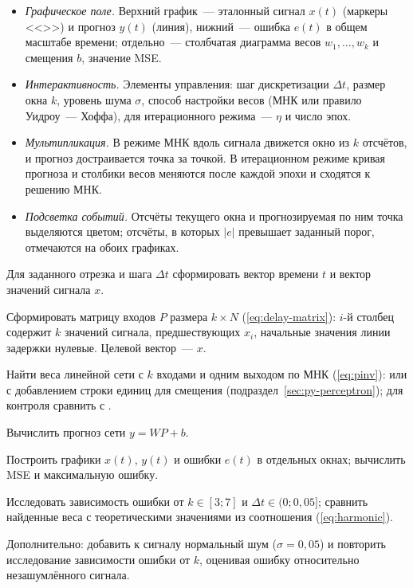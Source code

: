 \begin{itemize}
\item \emph{Графическое поле.} Верхний график~--- эталонный сигнал $x(t)$ (маркеры <<\code{*}>>) и прогноз $y(t)$ (линия), нижний~--- ошибка $e(t)$ в общем масштабе времени; отдельно~--- столбчатая диаграмма весов $w_1, \ldots, w_k$ и смещения $b$, значение MSE.
\item \emph{Интерактивность.} Элементы управления: шаг дискретизации $\Delta t$, размер окна $k$, уровень шума $\sigma$, способ настройки весов (МНК или правило Уидроу~--- Хоффа), для итерационного режима~--- $\eta$ и число эпох.
\item \emph{Мультипликация.} В режиме МНК вдоль сигнала движется окно из $k$ отсчётов, и прогноз достраивается точка за точкой. В итерационном режиме кривая прогноза и столбики весов меняются после каждой эпохи и сходятся к решению МНК.
\item \emph{Подсветка событий.} Отсчёты текущего окна и прогнозируемая по ним точка выделяются цветом; отсчёты, в которых $|e|$ превышает заданный порог, отмечаются на обоих графиках.
\end{itemize}

\begin{steps}
\item Для заданного отрезка и шага $\Delta t$ сформировать вектор времени $t$ и вектор значений сигнала $x$.
\item Сформировать матрицу входов $P$ размера $k \times N$ (\ref{eq:delay-matrix}): $i$-й столбец содержит
$k$ значений сигнала, предшествующих $x_i$, начальные значения линии задержки нулевые. Целевой
вектор~--- $x$.
\item Найти веса линейной сети с $k$ входами и одним выходом по МНК (\ref{eq:pinv}):
 или  с добавлением строки единиц для смещения
(подраздел~\ref{sec:py-perceptron}); для контроля сравнить с .
\item Вычислить прогноз сети $y = WP + b$.
\item Построить графики $x(t)$, $y(t)$ и ошибки $e(t)$ в отдельных окнах; вычислить MSE и максимальную
ошибку.
\item Исследовать зависимость ошибки от $k \in [3; 7]$ и $\Delta t \in (0; 0,05]$; сравнить найденные
веса с теоретическими значениями из соотношения (\ref{eq:harmonic}).
\item Дополнительно: добавить к сигналу нормальный шум ($\sigma = 0,05$) и повторить исследование
зависимости ошибки от $k$, оценивая ошибку относительно незашумлённого сигнала.
\end{steps}

